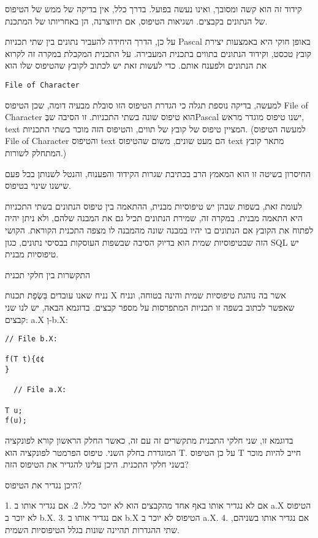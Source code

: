       קידוד זה הוא קשה ומסובך, ואינו נעשה בפועל. בדרך כלל, אין בדיקה של ממש של הטיפוס
      של הנתונים בקבצים. ושגיאות הטיפוס, אם תיווצרנה, הן באחריותו של המתכנת.

      על כן, הדרך היחידה להעביר נתונים בין שתי תכניות Pascal באופן חוקי היא באמצעות
      יצירת קובץ טכסט, וקידוד הנתונים בתווים בתכנית המעבירה. על התכנית המקבלת במקרה
      זה לקרוא את הנתונים ולפענח אותם. כדי לעשות זאת יש לכתוב לקובץ שהטיפוס שלו הוא

\begin{verbatim}
File of Character
\end{verbatim}
      למעשה, בדיקה נוספת תגלה כי הגדרת הטיפוס הזו סובלת מבעיה דומה, שכן הטיפוס File
      of Character הוא טיפוס שונה בשתי התכניות. זו הסיבה שבְּPascal ישנו טיפוס מוגדר
      מראש, text המציין טיפוס של קובץ של תווים, והטיפוס הזה מוכר בשתי התכניות. (למעשה
      הטיפוס File of Character והטיפוס text הם מעט שונים, משום שהטיפוס text מתאר קובץ
      המתחלק לשורות.)

      החיסרון בשיטה זו הוא המאמץ הרב בכתיבת שגרות הקידוד והפענוח, והנטל לשנותן בכל
      פעם שישנו שינוי בטיפוס.

      לעומת זאת, בשפות שבהן יש טיפוסיות מבנית, ההתאמה בין טיפוס הנתונים בשתי התכניות
      היא התאמה מבנית. במקרה זה, שמירת הנתונים תכיל גם את המבנה שלהם, ולא ניתן יהיה
      לפתוח את הקובץ אם הנתונים בו יהיו במבנה שונה מהמבנה לו מצפה התכנית הקוראת.
      הקושי הזה שבטיפוסיות שמית הוא בדיוק הסיבה שבשפות העוסקות בבסיסי נתונים, כגון
      SQL יש טיפוסיות מבנית.

      התקשרות בין חלקי תכנית

      נניח שאנו עובדים בִּשְׂפַת תכנות X אשר בה נוהגת טיפוסיות שמית והינה בטוחה, ונניח שאפשר לכתוב בשפה זו תכניות המתפרסות על מספר קבצים. בדוגמא הבאה, יש לנו שני קבצים: a.X וְ-b.X:

\begin{verbatim}
// File b.X:

f(T t){¢¢
}

  // File a.X:

T u;
f(u);
\end{verbatim}

      בדוגמא זו, שני חלקי התכנית מתקשרים זה עם זה, כאשר החלק הראשון קורא לפונקציה
      המוגדרת בחלק השני. טיפוס הפרמטר לפונקציה הוא T. על כן הטיפוס T חייב להיות מוכר
      בשני חלקי התכנית. היכן עלינו להגדיר את הטיפוס הזה?

      היכן נגדיר את הטיפוס?

      1. אם לא נגדיר אותו באף אחד מהקבצים הוא לא יוכר כלל.
      2. אם נגדיר אותו ב a.X הטיפוס לא יוכר ב b.X.
      3. אם נגדיר אותו ב b.X הטיפוס לא יוכר ב a.X.
      4. אם נגדיר אותו בשניהם, שתי ההגדרות תהיינה שונות בגלל הטיפוסיות השמית.


